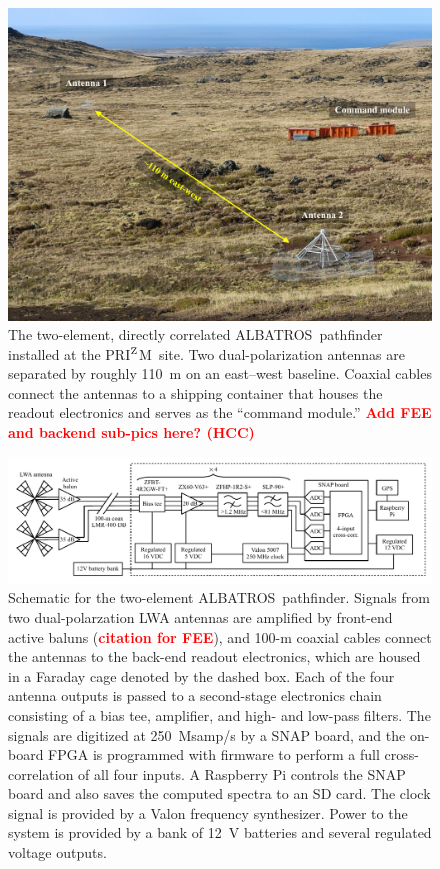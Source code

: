 \documentclass{ws-jai}
\def\albatros{ALBATROS}
\def\prizm{PRI$^{\rm Z}$M}
\begin{document}
\begin{figure}
  \begin{center}
    \includegraphics[width=0.7\linewidth]{Figures/albatros_2elem/albatros_2elem.pdf}
    \caption{The two-element, directly correlated
      \albatros\ pathfinder installed at the \prizm\ site.  Two
      dual-polarization antennas are separated by roughly 110~m on an
      east--west baseline. Coaxial cables connect the antennas to a
      shipping container that houses the readout electronics and
      serves as the ``command module.'' \textcolor{red}{\bf Add FEE
        and backend sub-pics here? (HCC)}}
    \label{Fig:albatros2}
  \end{center}
\end{figure}

\begin{figure}
  \begin{center}
    \includegraphics[width=1.0\linewidth]{Figures/albatros_2elem_schematic/albatros_2elem_schematic.pdf}
    \caption{Schematic for the two-element \albatros\ pathfinder.
      Signals from two dual-polarzation LWA antennas are amplified by
      front-end active baluns (\textcolor{red}{\bf citation for FEE}),
      and 100-m coaxial cables connect the antennas to the back-end
      readout electronics, which are housed in a Faraday cage denoted
      by the dashed box.  Each of the four antenna outputs is passed
      to a second-stage electronics chain consisting of a bias tee,
      amplifier, and high- and low-pass filters.  The signals are
      digitized at 250~Msamp/s by a SNAP board, and the on-board FPGA
      is programmed with firmware to perform a full cross-correlation
      of all four inputs.  A Raspberry Pi controls the SNAP board and
      also saves the computed spectra to an SD card.  The clock signal
      is provided by a Valon frequency synthesizer.  Power to the
      system is provided by a bank of 12~V batteries and several
      regulated voltage outputs.}
    \label{Fig:albatros2_schem}
  \end{center}
\end{figure}
\end{document}

